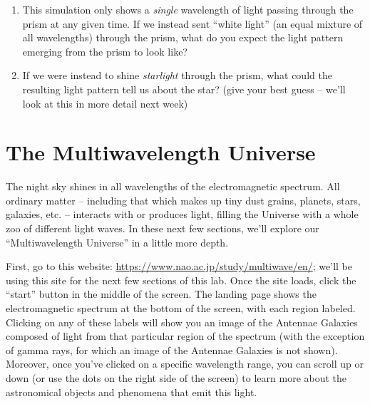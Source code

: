 \documentclass[11pt]{article}
\begin{document}
\begin{enumerate}
\begin{enumerate}
        \item This simulation only shows a \emph{single} wavelength of light passing through the prism at any given time. If we instead sent ``white light'' (an equal mixture of all wavelengths) through the prism, what do you expect the light pattern emerging from the prism to look like? 
        
        \item If we were instead to shine \emph{starlight} through the prism, what could the resulting light pattern tell us about the star? (give your best guess -- we'll look at this in more detail next week)
        
    \end{enumerate}
\end{enumerate}

\section{The Multiwavelength Universe}
The night sky shines in all wavelengths of the electromagnetic spectrum. All ordinary matter -- including that which makes up tiny dust grains, planets, stars, galaxies, etc. -- interacts with or produces light, filling the Universe with a whole zoo of different light waves. In these next few sections, we'll explore our ``Multiwavelength Universe'' in a little more depth.

\medskip \noindent
First, go to this website: \url{https://www.nao.ac.jp/study/multiwave/en/}; we'll be using this site for the next few sections of this lab. Once the site loads, click the ``start'' button in the middle of the screen. The landing page shows the electromagnetic spectrum at the bottom of the screen, with each region labeled. Clicking on any of these labels will show you an image of the Antennae Galaxies composed of light from that particular region of the spectrum (with the exception of gamma rays, for which an image of the Antennae Galaxies is not shown). Moreover, once you've clicked on a specific wavelength range, you can scroll up or down (or use the dots on the right side of the screen) to learn more about the astronomical objects and phenomena that emit this light.
\end{document}
